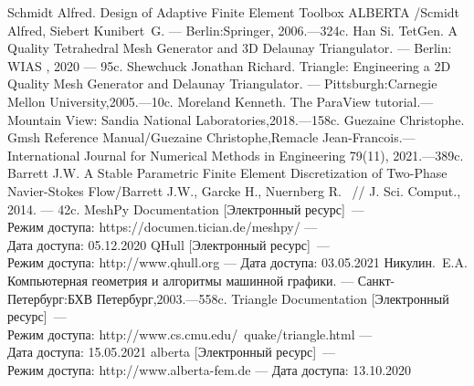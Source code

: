 \begin{thebibliography}{99}
 Schmidt Alfred. Design of Adaptive Finite Element Toolbox ALBERTA /Scmidt Alfred, Siebert Kunibert~G. --- Berlin:Springer, 2006.---324c.
 Han Si. TetGen. A Quality Tetrahedral Mesh Generator and 3D Delaunay Triangulator. --- Berlin: WIAS , 2020 --- 95c.
 Shewchuck Jonathan Richard. Triangle: Engineering a 2D Quality Mesh Generator and Delaunay Triangulator. --- Pittsburgh:Carnegie Mellon University,2005.---10c.
 Moreland Kenneth. The ParaView tutorial.---Mountain View: Sandia National Laboratories,2018.---158c.
 Guezaine Christophe. Gmsh Reference Manual/Guezaine Christophe,Remacle Jean-Francois.---International Journal for Numerical Methods in Engineering 79(11), 2021.---389c.
 Barrett J.W. A Stable Parametric Finite Element Discretization of Two-Phase
Navier-Stokes Flow/Barrett J.W.,
Garcke H., Nuernberg R. ~// J. Sci. Comput., 2014. --- 42c.
 MeshPy Documentation [Электронный ресурс]~--- \\Режим доступа: https://documen.tician.de/meshpy/ ---\\ Дата доступа: 05.12.2020
 QHull [Электронный ресурс]~--- \\Режим доступа: http://www.qhull.org --- Дата доступа: 03.05.2021
 Никулин.~E.A. Компьютерная геометрия и алгоритмы машинной графики. --- Санкт- Петербург:БХВ Петербург,2003.---558c.
 Triangle Documentation [Электронный ресурс]~--- \\Режим доступа: http://www.cs.cmu.edu/~quake/triangle.html ---\\ Дата доступа: 15.05.2021
 alberta [Электронный ресурс]~--- \\Режим доступа: http://www.alberta-fem.de --- Дата доступа: 13.10.2020

\end{thebibliography}
